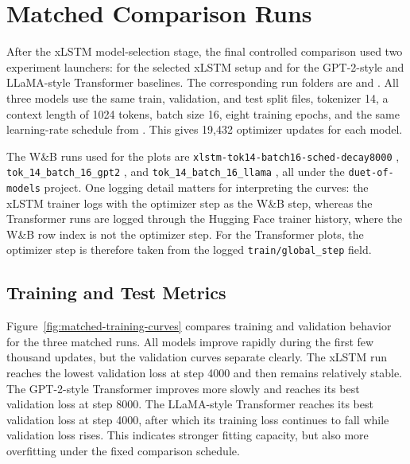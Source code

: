 \section{Matched Comparison Runs}

After the xLSTM model-selection stage, the final controlled comparison used two
experiment launchers: 
for the selected xLSTM setup and
 for the GPT-2-style and
LLaMA-style Transformer baselines. The corresponding run folders are
 and
. All three models
use the same train, validation, and test split files, tokenizer 14, a context
length of 1024 tokens, batch size 16, eight training epochs, and the same
learning-rate schedule from
. This gives
19,432 optimizer updates for each model.

The W\&B runs used for the plots are \verb|xlstm-tok14-batch16-sched-decay8000|
, \verb|tok_14_batch_16_gpt2| , and
\verb|tok_14_batch_16_llama| , all under the
\verb|duet-of-models| project. One logging detail matters for interpreting the
curves: the xLSTM trainer logs with the optimizer step as the W\&B step, whereas
the Transformer runs are logged through the Hugging Face trainer history, where
the W\&B row index is not the optimizer step. For the Transformer plots, the
optimizer step is therefore taken from the logged \verb|train/global_step|
field.

\subsection{Training and Test Metrics}

Figure~\ref{fig:matched-training-curves} compares training and validation
behavior for the three matched runs. All models improve rapidly during the first
few thousand updates, but the validation curves separate clearly. The xLSTM run
reaches the lowest validation loss at step 4000 and then remains relatively
stable. The GPT-2-style Transformer improves more slowly and reaches its best
validation loss at step 8000. The LLaMA-style Transformer reaches its best
validation loss at step 4000, after which its training loss continues to fall
while validation loss rises. This indicates stronger fitting capacity, but also
more overfitting under the fixed comparison schedule.

